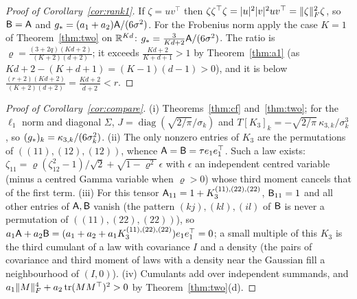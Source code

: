 \begin{proof}[Proof of Corollary~\ref{cor:rank1}]
If $\zeta=uv^\top$ then $\zeta\zeta^\top\zeta=|u|^2|v|^2uv^\top=\|\zeta\|_{F}^2\zeta$, so $\mathsf{B}=\mathsf{A}$ and
$g_\ast=(a_1+a_2)\mathsf{A}/(6\sigma^2)$. For the Frobenius norm apply the case $K=1$ of Theorem~\ref{thm:two} on $\mathbb{R}^{Kd}$:
$g_\ast=\frac3{Kd+2}\mathsf{A}/(6\sigma^2)$. The ratio is $\varrho=\frac{(3+2q)(Kd+2)}{(K+2)(d+2)}$; it exceeds
$\frac{Kd+2}{K+d+1}>1$ by Theorem~\ref{thm:a1} (as $Kd+2-(K+d+1)=(K-1)(d-1)>0$), and it is below
$\frac{(r+2)(Kd+2)}{(K+2)(d+2)}=\frac{Kd+2}{\bar d+2}<r$.
\end{proof}

\begin{proof}[Proof of Corollary~\ref{cor:compare}]
(i) Theorems~\ref{thm:cf} and~\ref{thm:two}; for the $\ell_1$ norm and diagonal $\Sigma$,
$J=\operatorname{diag}(\sqrt{2/\pi}/\sigma_k)$ and $T[K_3]_k=-\sqrt{2/\pi}\,\kappa_{3,k}/\sigma_k^3$, so
$(g_\ast)_k=\kappa_{3,k}/(6\sigma_k^2)$. (ii) The only nonzero entries of $K_3$ are the permutations of
$((11),(12),(12))$, whence $\mathsf{A}=\mathsf{B}=\tau e_1e_1^\top$. Such a law exists:
$\zeta_{11}=\varrho(\zeta_{12}^2-1)/\sqrt2+\sqrt{1-\varrho^2}\,\epsilon$ with $\epsilon$ an independent centred variable
(minus a centred Gamma variable when $\varrho>0$) whose third moment cancels that of the first term. (iii) For this tensor
$\mathsf{A}_{11}=1+K_3^{(11),(22),(22)}$, $\mathsf{B}_{11}=1$ and all other entries of $\mathsf{A},\mathsf{B}$ vanish (the pattern
$(kj),(kl),(il)$ of $\mathsf{B}$ is never a permutation of $((11),(22),(22))$), so
$a_1\mathsf{A}+a_2\mathsf{B}=(a_1+a_2+a_1K_3^{(11),(22),(22)})e_1e_1^\top=0$; a small multiple of this $K_3$ is the third cumulant of a law
with covariance $I$ and a density (the pairs of covariance and third moment of laws with a density near the Gaussian
fill a neighbourhood of $(I,0)$). (iv) Cumulants add over independent summands, and
$a_1\|M\|_{F}^4+a_2\operatorname{tr}(MM^\top)^2>0$ by Theorem~\ref{thm:two}(d).
\end{proof}
